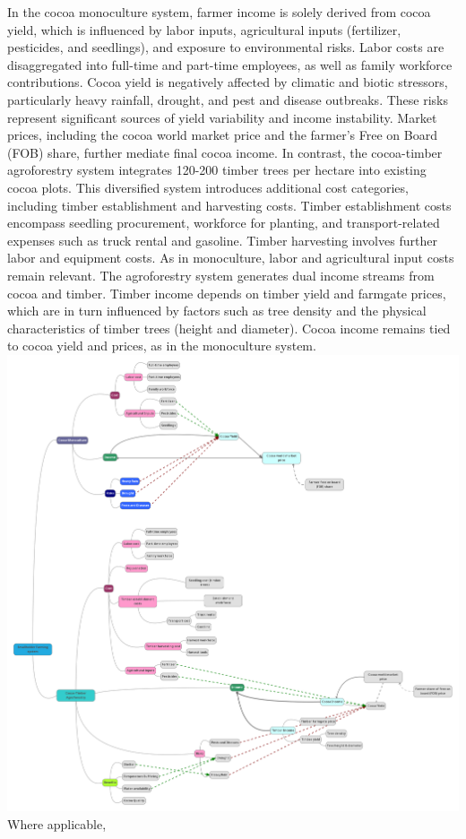 \documentclass[
]{article}
\begin{document}
In the cocoa monoculture system, farmer income is solely derived from
cocoa yield, which is influenced by labor inputs, agricultural inputs
(fertilizer, pesticides, and seedlings), and exposure to environmental
risks. Labor costs are disaggregated into full-time and part-time
employees, as well as family workforce contributions. Cocoa yield is
negatively affected by climatic and biotic stressors, particularly heavy
rainfall, drought, and pest and disease outbreaks. These risks represent
significant sources of yield variability and income instability. Market
prices, including the cocoa world market price and the farmer's Free on
Board (FOB) share, further mediate final cocoa income. In contrast, the
cocoa-timber agroforestry system integrates 120-200 timber trees per
hectare into existing cocoa plots. This diversified system introduces
additional cost categories, including timber establishment and
harvesting costs. Timber establishment costs encompass seedling
procurement, workforce for planting, and transport-related expenses such
as truck rental and gasoline. Timber harvesting involves further labor
and equipment costs. As in monoculture, labor and agricultural input
costs remain relevant. The agroforestry system generates dual income
streams from cocoa and timber. Timber income depends on timber yield and
farmgate prices, which are in turn influenced by factors such as tree
density and the physical characteristics of timber trees (height and
diameter). Cocoa income remains tied to cocoa yield and prices, as in
the monoculture system. \includegraphics{Figure_1.png} Where applicable,
\end{document}
